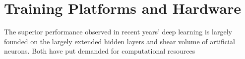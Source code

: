 \section{Training Platforms and Hardware}
The superior performance observed in recent years' deep learning is largely founded on the largely extended hidden layers and shear volume of artificial neurons. Both have put demanded for computational resources 